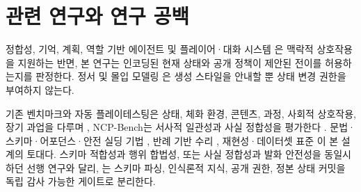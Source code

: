 \section{관련 연구와 연구 공백}
정합성, 기억, 계획, 역할 기반 에이전트 \cite{S03_weir2024ontologically,S20_ashby2023personalized,S07_park2023generative,S08_shao2023character} 및 플레이어·대화 시스템 \cite{S21_akoury2023player,S22_hochreiter2026beyond,S23_yin2026contextualized,S02_figueiredo2025scaffolded}은 맥락적 상호작용을 지원하는 반면, 본 연구는 인코딩된 현재 상태와 공개 정책이 제안된 전이를 허용하는지를 판정한다. 정서 및 몰입 모델링 \cite{S24_yannakakis2011experiencedriven,S25_melhart2020engagement,S26_wang2026engagement}은 생성 스타일을 안내할 뿐 상태 변경 권한을 부여하지 않는다.

기존 벤치마크와 자동 플레이테스팅은 상태, 체화 환경, 콘텐츠, 과정, 사회적 상호작용, 장기 과업을 다루며 \cite{S11_cote2019textworld,S12_wang2022scienceworld,S13_fan2022minedojo,S14_perezliebana2019gvgai,S15_liu2024agentbench,S16_ma2024agentboard,S17_zhou2024sotopia,S18_paglieri2025balrog,S19_lepelletier2022playtesting}, NCP-Bench는 서사적 일관성과 사실 정합성을 평가한다 \cite{S58_ma2026ncpbench}. 문법·스키마·어포던스·안전 실딩 기법 \cite{S09_geng2023grammar,S10_beurerkellner2023prompting,S36_scholak2021picard,S50_kambhampati2024llmmodulo,S51_ichter2023saycan,S52_wang2025agentspec,S53_li2025settingdc,S54_zhou2025story2game,S42_buongiorno2024pangea,alshiekh2018shield,rebedea2023nemo}, 반례 기반 수리 \cite{S45_madaan2023selfrefine,S48_shinn2023reflexion,S46_chen2023selfdebug,S47_solarlezama2006sketching}, 재현성·데이터셋 표준 \cite{S31_agarwal2021precipice,S33_pineau2021reproducibility,S56_feng2025agentrr,S59_sun2025bdc,gebru2021datasheets,akhtar2024croissant}이 본 설계의 토대다. 스키마 적합성과 행위 합법성, 또는 사실 정합성과 발화 안전성을 동일시하던 선행 연구와 달리, \system{}는 스키마 파싱, 인식론적 지식, 공개 권한, 정본 상태 커밋을 독립 감사 가능한 게이트로 분리한다.

